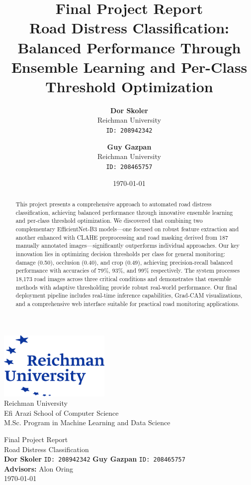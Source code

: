 \documentclass[12pt]{article}
\title{
    \Huge \textbf{Final Project Report}\\[1em]
    \Large \textbf{Road Distress Classification: Balanced Performance Through Ensemble Learning and Per-Class Threshold Optimization}
}
\author{%
  \textbf{Dor Skoler}\\
  Reichman University\\
  \texttt{ID: 208942342}%
  \and
  \textbf{Guy Gazpan}\\
  Reichman University\\
  \texttt{ID: 208465757}%
}
\date{\today}
\begin{document}
\begin{titlepage}
\centering
\includegraphics[width=0.4\textwidth]{images/runi_logo.png}\\[1em]
{\LARGE Reichman University}\\[1em]
{\large Efi Arazi School of Computer Science}\\[1em]
{\large M.Sc. Program in Machine Learning and Data Science}\\[1em]
\vspace{2.5em}

{\Huge Final Project Report}\\[1.5em]
{\Large Road Distress Classification}\\[1em]
{\small \textbf{Dor Skoler} \quad \texttt{ID: 208942342} \quad \textbf{Guy Gazpan} \quad \texttt{ID: 208465757}}\\[1em]
{\small \textbf{Advisors:} Alon Oring}\\[1em]
{\small \today}\\[2em]

\begin{abstract}
This project presents a comprehensive approach to automated road distress classification, achieving balanced performance through innovative ensemble learning and per-class threshold optimization. We discovered that combining two complementary EfficientNet-B3 models—one focused on robust feature extraction and another enhanced with CLAHE preprocessing and road masking derived from 187 manually annotated images—significantly outperforms individual approaches. Our key innovation lies in optimizing decision thresholds per class for general monitoring: damage (0.50), occlusion (0.40), and crop (0.49), achieving precision-recall balanced performance with accuracies of 79\%, 93\%, and 99\% respectively. The system processes 18,173 road images across three critical conditions and demonstrates that ensemble methods with adaptive thresholding provide robust real-world performance. Our final deployment pipeline includes real-time inference capabilities, Grad-CAM visualizations, and a comprehensive web interface suitable for practical road monitoring applications.
\end{abstract}

\end{titlepage}
\end{document}
